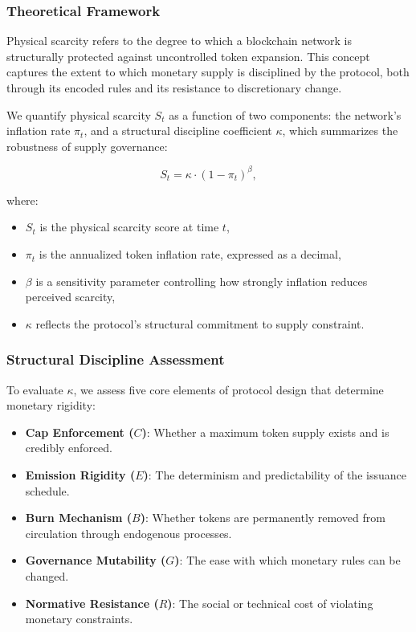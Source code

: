 \documentclass[12pt]{article}
\begin{document}
\subsubsection{Theoretical Framework}

Physical scarcity refers to the degree to which a blockchain network is structurally protected against uncontrolled token expansion. This concept captures the extent to which monetary supply is disciplined by the protocol, both through its encoded rules and its resistance to discretionary change.

We quantify physical scarcity \( S_t \) as a function of two components: the network's inflation rate \( \pi_t \), and a structural discipline coefficient \( \kappa \), which summarizes the robustness of supply governance:

\begin{equation}
S_t = \kappa \cdot (1 - \pi_t)^{\beta},
\label{eq:physical_scarcity}
\end{equation}

\noindent where:
\begin{itemize}
    \item \( S_t \) is the physical scarcity score at time \( t \),
    \item \( \pi_t \) is the annualized token inflation rate, expressed as a decimal,
    \item \( \beta \) is a sensitivity parameter controlling how strongly inflation reduces perceived scarcity,
    \item \( \kappa \) reflects the protocol’s structural commitment to supply constraint.
\end{itemize}

\subsubsection{Structural Discipline Assessment}

To evaluate \( \kappa \), we assess five core elements of protocol design that determine monetary rigidity:

\begin{itemize}
    \item \textbf{Cap Enforcement (\( C \))}: Whether a maximum token supply exists and is credibly enforced.
    \item \textbf{Emission Rigidity (\( E \))}: The determinism and predictability of the issuance schedule.
    \item \textbf{Burn Mechanism (\( B \))}: Whether tokens are permanently removed from circulation through endogenous processes.
    \item \textbf{Governance Mutability (\( G \))}: The ease with which monetary rules can be changed.
    \item \textbf{Normative Resistance (\( R \))}: The social or technical cost of violating monetary constraints.
\end{itemize}
\end{document}
